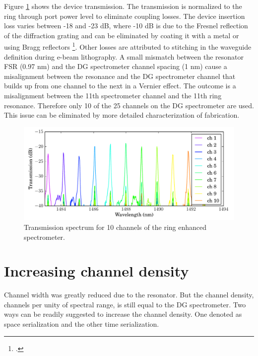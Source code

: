 \documentclass[12pt,twoside,english]{book}
\renewcommand{\~}{\perispomeni}%
\numberwithin{equation}{section}
\numberwithin{figure}{section}
\begin{document}
Figure \ref{fig:RES spectrum} shows the device transmission. The transmission is normalized to the ring through port power level to eliminate coupling losses. The device insertion loss varies between -18 and -23 dB, where -10 dB is due to the Fresnel reflection of the diffraction grating and can be eliminated by coating it with a metal or using Bragg reflectors \footcite{Brouckaert:2008p108}. Other losses are attributed to stitching in the waveguide definition during e-beam lithography. A small mismatch between the resonator FSR (0.97 nm) and the DG spectrometer channel spacing (1 nm) cause a misalignment between the resonance and the DG spectrometer channel that builds up from one channel to the next in a Vernier effect. The outcome is a misalignment between the 11th spectrometer channel and the 11th ring resonance. Therefore only 10 of the 25 channels on the DG spectrometer are used. This issue can be eliminated by more detailed characterization of fabrication.
\begin{figure}[h] \noindent \begin{centering}
\includegraphics{graphs/low-density-ring-enhanced}
\par\end{centering}
\caption{Transmission spectrum for 10 channels of the ring enhanced spectrometer.\label{fig:RES spectrum}}
\end{figure} 


\section{Increasing channel density}

Channel width was greatly reduced due to the resonator. But the channel density, channels per unity of spectral range, is still equal to the DG spectrometer. Two ways can be readily suggested to increase the channel density. One denoted as space serialization and the other time serialization. 
\end{document}
